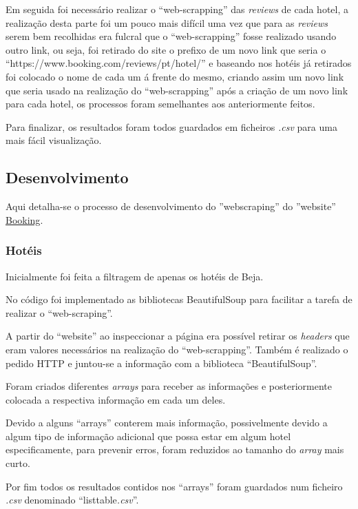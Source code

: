 Em seguida foi necessário realizar o ``web-scrapping'' das \textit{reviews} de cada hotel, a realização desta parte foi um pouco mais difícil uma vez que para as \textit{reviews} serem bem recolhidas era fulcral que o ``web-scrapping'' fosse realizado usando outro link, ou seja, foi retirado do site o prefixo de um novo link que seria o ``https://www.booking.com/reviews/pt/hotel/'' e baseando nos hotéis já retirados foi colocado o nome de cada um á frente do mesmo, criando assim um novo link que seria usado na realização do ``web-scrapping'' após a criação de um novo link para cada hotel, os processos foram semelhantes aos anteriormente feitos.

Para finalizar, os resultados foram todos guardados em ficheiros \textit{.csv} para uma mais fácil visualização.

\subsection{Desenvolvimento}

Aqui detalha-se o processo de desenvolvimento do ''webscraping'' do ''website'' \href{https://www.booking.com/country/pt.pt-pt.html}{Booking}.

\subsubsection{Hotéis}

Inicialmente foi feita a filtragem de apenas os hotéis de Beja.

\newpage
No código foi implementado as bibliotecas BeautifulSoup para facilitar a tarefa de realizar o ``web-scraping''.

A partir do ``website'' ao inspeccionar a página era possível retirar os \textit{headers} que eram valores necessários na realização do ``web-scrapping''.
Também é realizado o pedido HTTP e juntou-se a informação com a biblioteca ``BeautifulSoup''.

Foram criados diferentes \textit{arrays} para receber as informações e posteriormente colocada a respectiva informação em cada um deles.

Devido a alguns ``arrays'' conterem mais informação, possivelmente devido a algum tipo de informação adicional que possa estar em algum hotel especificamente, para prevenir erros, foram reduzidos ao tamanho do \textit{array} mais curto.

Por fim todos os resultados contidos nos ``arrays'' foram guardados num ficheiro \textit{.csv} denominado ``listtable\textit{.csv}''.

